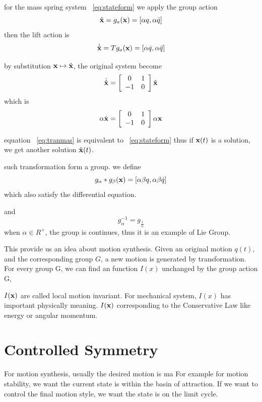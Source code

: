 for the mass spring system ~\ref{eq:stateform}
we apply the group action 
\[
\hat{\mathbf{x}}=g_a(\mathbf{x})=[\alpha q, \alpha \dot{q} ]
\]
then the lift action is
\[
\dot{\hat{\mathbf{x}}}=Tg_a(\mathbf{x})=[\alpha \dot{q}, \alpha \ddot{q}]
\]



by substitution $\mathbf{x} \mapsto \hat{\mathbf{x}}$, the original system become
\[ 
\dot{\hat{\mathbf{x}}}=
\left[ 
\begin{array}{cc}
0 &1\\
-1 &0 
\end{array}
\right]\hat{\mathbf{x}}
\]
which is 
\begin{equation}
\label{eq:tranmas} 
\alpha \dot{\mathbf{x}}=
\left[ 
\begin{array}{cc}
0 &1\\
-1 &0 
\end{array}
\right]\alpha \mathbf{x}
\end{equation}

equation ~\ref{eq:tranmas} is equivalent to  ~\ref{eq:stateform}
thus if $\mathbf{x}(t)$ is a solution, we get another solution $\hat{\mathbf{x}}(t)$.

such transformation form a group.
we define 
\[
g_{\alpha}*g_{\beta}(\mathbf{x})=[\alpha \beta q, \alpha \beta \dot{q}]
\]
which also satisfy the differential equation.

and 
\[
g_{\alpha}^{-1}=g_{\frac{1}{\alpha}}
\]
when $\alpha \in R^+$, the group is continues,
thus it is an example of Lie Group.





This provide us an idea about motion synthesis.
Given an original motion $q(t)$, and the corresponding group $G$, a new motion is generated by transformation.
For every group G, we can find an function $I(x)$ unchanged by the group action G, 

$I(\mathbf{x})$ are called local motion invariant. 
For mechanical system,  $I(x)$ has important physically meaning. 
$I(\mathbf{x})$ corresponding to the Conservative Law like energy or angular momentum.


\section{Controlled Symmetry}
For motion synthesis, usually the desired motion is ma
For example for motion stability, we want the current state is within the basin of attraction.
If we want to control the final motion style, we want the state is on the limit cycle.

